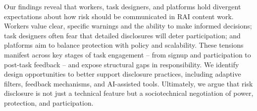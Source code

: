 
Our findings reveal that workers, task designers, and platforms hold divergent expectations about how risk should be communicated in RAI content work. Workers value clear, specific warnings and the ability to make informed decisions; task designers often fear that detailed disclosures will deter participation; and platforms aim to balance protection with policy and scalability. These tensions manifest across key stages of task engagement -- from signup and participation to post-task feedback -- and expose structural gaps in responsibility. We identify design opportunities to better support disclosure practices, including adaptive filters, feedback mechanisms, and AI-assisted tools. Ultimately, we argue that risk disclosure is not just a technical feature but a sociotechnical negotiation of power, protection, and participation. 

